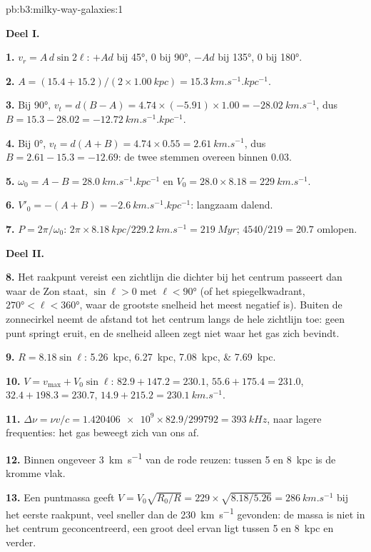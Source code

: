 \begin{solution}{pb:b3:milky-way-galaxies:1}

\textbf{Deel I.}

\textbf{1.} $v_r = A\,d\sin2\ell$: $+A d$ bij \ang{45}, 0 bij \ang{90}, $-A d$ bij
\ang{135}, 0 bij \ang{180}.

\textbf{2.} $A = (15.4 + 15.2)/(2\times\qty{1.00}{kpc}) =
\qty{15.3}{km.s^{-1}.kpc^{-1}}$.

\textbf{3.} Bij \ang{90}, $v_t = d(B - A) = 4.74\times(-5.91)\times1.00 =
\qty{-28.02}{km.s^{-1}}$, dus $B = 15.3 - 28.02 =
\qty{-12.72}{km.s^{-1}.kpc^{-1}}$.

\textbf{4.} Bij \ang{0}, $v_t = d(A + B) = 4.74\times0.55 =
\qty{2.61}{km.s^{-1}}$, dus $B = 2.61 - 15.3 = \num{-12.69}$: de twee
stemmen overeen binnen \num{0.03}.

\textbf{5.} $\omega_0 = A - B = \qty{28.0}{km.s^{-1}.kpc^{-1}}$ en
$V_0 = 28.0\times8.18 = \qty{229}{km.s^{-1}}$.

\textbf{6.} $V'_0 = -(A + B) = \qty{-2.6}{km.s^{-1}.kpc^{-1}}$: langzaam dalend.

\textbf{7.} $P = 2\pi/\omega_0$: $2\pi\times\qty{8.18}{kpc}/\qty{229.2}{km.s^{-1}}
= \qty{219}{Myr}$; $4540/219 = 20.7$ omlopen.

\textbf{Deel II.}

\textbf{8.} Het raakpunt vereist een zichtlijn die dichter bij het
centrum passeert dan waar de Zon staat, $\sin\ell > 0$ met $\ell < \ang{90}$ (of het
spiegelkwadrant, $\ang{270} < \ell < \ang{360}$, waar de grootste
snelheid het meest negatief is). Buiten de zonnecirkel neemt de
afstand tot het centrum langs de hele zichtlijn toe: geen punt springt
eruit, en de snelheid alleen zegt niet waar het gas zich bevindt.

\textbf{9.} $R = 8.18\sin\ell$: \qtylist{5.26;6.27;7.08;7.69}{kpc}.

\textbf{10.} $V = v_\mathrm{max} + V_0\sin\ell$: $82.9 + 147.2 = 230.1$,
$55.6 + 175.4 = 231.0$, $32.4 + 198.3 = 230.7$, $14.9 + 215.2 =
\qty{230.1}{km.s^{-1}}$.

\textbf{11.} $\Delta\nu = \nu v/c = \num{1.420406e9}\times82.9/299792 =
\qty{393}{kHz}$, naar lagere frequenties: het gas beweegt zich van ons af.

\textbf{12.} Binnen ongeveer \qty{3}{km.s^{-1}} van de rode reuzen: tussen 5 en
\qty{8}{kpc} is de kromme vlak.

\textbf{13.} Een puntmassa geeft $V = V_0\sqrt{R_0/R} = 229\times\sqrt{8.18/5.26} =
\qty{286}{km.s^{-1}}$ bij het eerste raakpunt, veel sneller dan de
\qty{230}{km.s^{-1}} gevonden: de massa is niet in het centrum geconcentreerd,
een groot deel ervan ligt tussen 5 en \qty{8}{kpc} en verder.


\end{solution}
